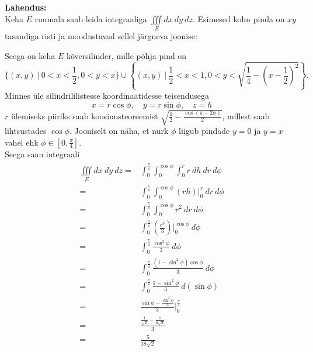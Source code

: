 \documentclass{article}
\begin{document}
\textbf{Lahendus:}\\
Keha $E$ ruumala saab leida integraaliga $\iiint\limits_E dx\ dy\ dz$. Esimesed kolm pinda on $xy$ tasandiga risti ja moodustavad sellel järgneva joonise: 
\begin{center}
\end{center}
Seega on keha $E$ kõversilinder, mille põhja pind on $$\{(x,y)\ |\ 0<x<\frac{1}{2},0<y<x\}\cup\left\{(x,y)\ \Big|\ \frac{1}{2}<x<1,0<y<\sqrt{\frac14-\left(x-\frac12\right)^2}\right\}.$$Minnes üle silindrililistesse koordinaatidesse teisendusega $$x=r\cos\phi,\quad y=r\sin\phi,\quad z=h$$ $r$ ülemiseks piiriks saab koosinusteoreemist $\sqrt{\frac12-\frac{\cos(\pi-2\phi)}2}$, millest saab lihtsustades $\cos\phi$. Jooniselt on näha, et nurk $\phi$ liigub pindade $y=0$ ja $y=x$ vahel ehk $\phi\in\left[0,\frac{\pi}4\right]$.\\Seega saan integraali
\begin{gather*}
\begin{aligned}
\iiint\limits_E dx\ dy\ dz=&\int_0^{\frac{\pi}4}\int_0^{\cos\phi}\int_0^rr\ dh\ dr\ d\phi\\
=&\int_0^{\frac{\pi}4}\int_0^{\cos\phi}\left(rh\right)\big|_0^r\ dr\ d\phi\\
=&\int_0^{\frac{\pi}4}\int_0^{\cos\phi}r^2\ dr\ d\phi\\
=&\int_0^{\frac{\pi}4}\left(\frac{r^3}3\right)\bigg|_0^{\cos\phi}\ d\phi\\
=&\int_0^{\frac{\pi}4}\frac{\cos^3\phi}3\ d\phi\\
=&\int_0^{\frac{\pi}4}\frac{(1-\sin^2\phi)\cos\phi}3\ d\phi\\
=&\int_0^{\frac{\pi}4}\frac{1-\sin^2\phi}3\ d(\sin\phi)\\
=&\frac{\sin\phi-\frac{\sin^3\phi}3}3\bigg|_0^{\frac{\pi}4}\\
=&\frac{\frac1{\sqrt{2}}-\frac{1}{6\sqrt{2}}}3\\
=&\frac{5}{18\sqrt{2}}\\
\end{aligned}
\end{gather*} 
\end{document}
